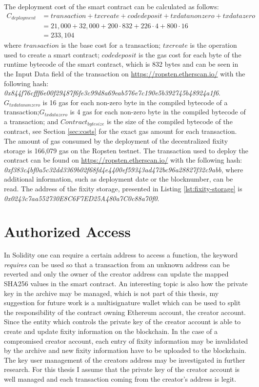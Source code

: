 \documentclass[final]{vutinfth}
\begin{document}
The deployment cost of the smart contract can be calculated as follows:
\begin{equation}\label{eq:create-cost}
  \begin{split}
      C_{deployment} & = transaction + txcreate + codedeposit + txdatanonzero + txdatazero \\
      & = 21,000 + 32,000 + 200 \cdot 832 + 226 \cdot 4 + 800 \cdot 16 \\
      & = 233,104
  \end{split}
\end{equation}
where $transaction$ is the base cost for a transaction; $txcreate$ is the operation used to create a smart contract; $codedeposit$ is the gas cost for each byte of the runtime bytecode of the smart contract, which is 832 bytes and can be seen in the Input Data field of the transaction on \url{https://ropsten.etherscan.io/} with the following hash: \textit{0x844f76cfff6e00f29487f6fe3c99d8a69eab576e7c190e5b392745b48924a1f6}.
\textit{$G_{txdatanonzero}$} is 16 gas for each non-zero byte in the compiled bytecode of a transaction;\textit{$G_{txdatazero}$} is 4 gas for each non-zero byte in the compiled bytecode of a transaction; and \textit{$Contract_{bytesize}$} is the size of the compiled bytecode of the contract, see Section \ref{sec:costs} for the exact gas amount for each transaction.
The amount of gas consumed by the deployment of the decentralized fixity storage is 166,079 gas on the Ropsten testnet. The transaction used to deploy the contract can be found on \url{https://ropsten.etherscan.io/} with the following hash: \textit{0xf383c4bf0a5c32dd3369b02f68fd4e4400ef59343ad472bc96a28827f32c9abb}, where additional information, such as deployment date or the blocknumber, can be read. The address of the fixity storage, presented in Listing \ref{lst:fixity-storage} is \textit{0x0243c7aa552730E8C6F7ED25A480a7C0c88a70f0}.
\section{Authorized Access}
In Solidity one can require a certain address to access a function, the keyword \textit{requires} can be used so that a transaction from an unknown address can be reverted and only the owner of the creator address can update the mapped SHA256 values in the smart contract. An interesting topic is also how the private key in the archive may be managed, which is not part of this thesis, my suggestion for future work is a  multisignature wallet which can be used to split the responsibility of the contract owning Ethereum account, the creator account. Since the entity which controls the private key of the creator account is able to create and update fixity information on the blockchain. In the case of a compromised creator account, each entry of fixity information may be invalidated by the archive and new fixity information have to be uploaded to the blockchain. The key user management of the creators address may be investigated in further research. For this thesis I assume that the private key of the creator account is well managed and each transaction coming from the creator's address is legit.
\end{document}
